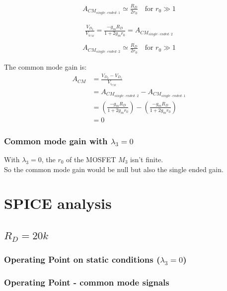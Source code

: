 \documentclass[10pt,a4paper]{book}
\begin{document}
\begin{align}
A_{CM_{single\cdot ended\cdot 1}} \simeq \frac{R_{D}}{2r_0} \quad \text{for } r_0 \gg 1
\end{align}

\begin{align}
\frac{V_{D_2}}{V_{i_{CM}}} = \frac{-g_m R_{D}}{1+2g_m r_0} = A_{CM_{single\cdot ended\cdot 2}}\\
\end{align}
\begin{align}
A_{CM_{single\cdot ended\cdot 2}} \simeq \frac{R_{D}}{2r_0} \quad \text{for } r_0 \gg 1
\end{align}

The common mode gain is:\\
\begin{align}
A_{CM} &= \frac{V_{D_2} - V_{D_1}}{V_{i_{CM}}}\\
&= A_{CM_{single\cdot ended\cdot 2}} -A_{CM_{single\cdot ended\cdot 1}} \\
&= \left(\frac{-g_m R_{D}}{1+2g_m r_0} \right) - \left(\frac{-g_m R_{D}}{1+2g_m r_0} \right)\\
&= 0
\end{align}

\subsubsection{Common mode gain with $\lambda_3 = 0$}
With $\lambda_3 = 0$, the $r_0$ of the MOSFET $M_3$ isn't finite.\\
So the common mode gain would be null but also the single ended gain.\par

\clearpage
\section{SPICE analysis}
\subsection{$R_D = 20k$}
\subsubsection{Operating Point on static conditions ($\lambda_3 = 0$)}



\subsubsection{Operating Point - common mode signals}


\end{document}
